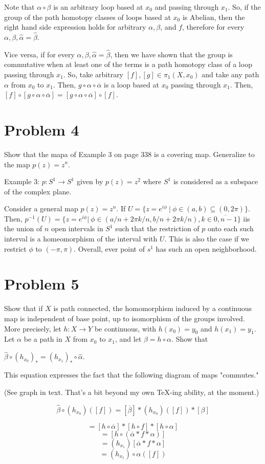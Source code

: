 \documentclass[11pt]{article}
\begin{document}
Note that \(\alpha\circ\beta\) is an arbitrary loop based at \(x_0\) and passing
through \(x_1\). So, if the group of the path homotopy classes of loops based at
\(x_0\) is Abelian, then the right hand side expression holds for arbitrary
\(\alpha, \beta\), and \(f\), therefore for every \(\alpha, \beta, \hat{\alpha} =
\hat{\beta}\). 

Vice versa, if for every \(\alpha, \beta, \hat{\alpha} = \hat{\beta}\), then we
have shown that the group is commutative when at least one of the terms is a
path homotopy class of a loop passing through \(x_1\). So, take arbitrary \([f],
[g] \in \pi_1(X, x_0)\) and take any path \(\alpha\) from \(x_0\) to \(x_1\). Then,
\(g\circ\alpha\circ\overline{\alpha}\) is a loop based at \(x_0\) passing through
\(x_1\). Then, \([f]\circ[g\circ\alpha\circ\overline{\alpha}] = 
[g\circ\alpha\circ\overline{\alpha}]\circ[f]\). 

\section{Problem 4}
\label{sec:org547a0fe}
Show that the mapa of Example 3 on page 338 is a covering map. Generalize to the
map \(p(z) = z^n\).

Example 3: \(p: S^1\rightarrow S^1\) given by \(p(z) = z^2\) where \(S^1\) is
considered as a subspace of the complex plane. 

Consider a general map \(p(z) = z^n\). If \(U = \{z = e^{i\phi}\ |\ \phi\in
(a,b)\subseteq (0, 2\pi)\}\). Then, \(p^{-1}(U) = \{z = e^{i\phi}|\ \phi\in (a/n +
2\pi k/n, b/n + 2\pi k/n), k\in \overline{0, n-1}\}\) iis the union of \(n\) open
intervals in \(S^1\) such that the restriction of \(p\) onto each such interval is a
homeomorphism of the interval with \(U\). This is also the case if we restrict
\(\phi\) to \((-\pi, \pi)\). Overall, ever point of \(s^1\) has such an open
neighborhood. 

\section{Problem 5}
\label{sec:org284b307}
Show that if \(X\) is path connected, the homomorphism induced by a continuous map
is independent of base point, up to isomorphism of the groups involved. More
precisely, let \(h: X\rightarrow Y\) be continuous, with \(h(x_0) = y_0\) and
\(h(x_1) = y_1\). Let \(\alpha\) be a path in \(X\) from \(x_0\) to \(x_1\), and let
\(\beta = h\circ \alpha\). Show that 

\(\hat{\beta}\circ(h_{x_0})_* = (h_{x_1})_*\circ \hat{\alpha}\). 

This equation expresses the fact that the following diagram of maps "commutes."

(See graph in text. That's a bit beyond my own \TeX{}-ing ability, at the moment.)


$$ \hat{\beta}\circ(h_{x_0})([f])
= [\overline{\beta}]*(h_{x_0})([f])*[\beta] $$

$$ = [h\circ \overline{\alpha}]*[h\circ f]*[h\circ\alpha] $$
$$ = [h\circ(\overline{\alpha}*f*\alpha)] $$ 
$$ = (h_{x_1})[\overline{\alpha}*f*\alpha] $$ 
$$ = (h_{x_1})\circ \alpha([f]) $$
\end{document}
